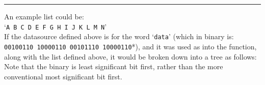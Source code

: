 \hrule
\newpage
An example list could be:\\
`\texttt{A B C D E F G H I J K L M N}'\\
If the datasource defined above is for the word `\texttt{data}' (which in binary is:
\texttt{00100110 10000110 00101110 10000110}*), and it was used as into the function, along with the list defined above, it would be broken down into a tree as follows:\\
{\small *Note that the binary is least significant bit first, rather than the more conventional most significant bit first.}


